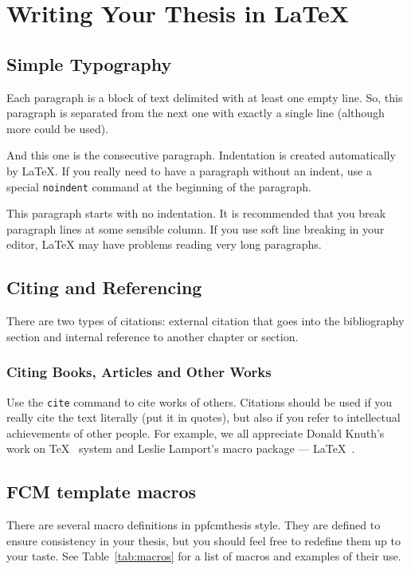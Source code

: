 
\chapter{Writing Your Thesis in \LaTeX}

\section{Simple Typography}

Each paragraph is a block of text delimited with at least one empty line. So, this
paragraph is separated from the next one with exactly a single line (although
more could be used).

And this one is the consecutive paragraph. Indentation is created automatically by
\LaTeX{}. If you really need to have a paragraph without an indent, use a special
\texttt{noindent} command at the beginning of the paragraph.

\noindent This paragraph starts with no indentation. It is recommended that you break
paragraph lines at some sensible column. If you use soft line breaking in your editor,
\LaTeX{} may have problems reading very long paragraphs.


\section{Citing and Referencing}

There are two types of citations: external citation that goes into the bibliography section
and internal reference to another chapter or section.

\subsection{Citing Books, Articles and Other Works}

Use the \texttt{cite} command to cite works of others. Citations should be used if you really cite
the text literally (put it in quotes), but also if you refer to intellectual achievements of other
people. For example, we all appreciate Donald Knuth's work on \TeX{}~\cite{Knuth:ct-a} system and Leslie
Lamport's macro package --- \LaTeX{}~\cite{Lamport:LDP85}.


\section{FCM template macros}

There are several macro definitions in ppfcmthesis style. They are defined to ensure
consistency in your thesis, but you should feel free to redefine them up to your taste.
See Table~\ref{tab:macros} for a list of macros and examples of their use.

